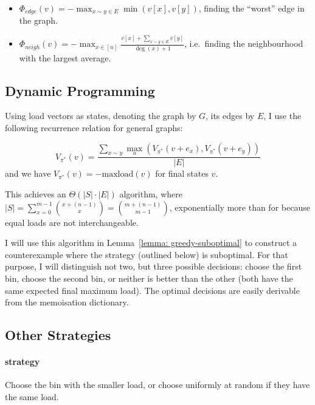 \begin{itemize}
    \item 
    $\Phi_{edge}(v)=-\max_{x\sim y \in E} \min(v[x], v[y])$, finding the ``worst'' edge in the graph.
    \item
    $\Phi_{neigh}(v)=-\max_{x \in [n]} \frac{v[x]+\sum_{x\sim y \in E}v[y]}{\deg(x)+1}$, i.e.\ finding the neighbourhood with the largest average.
\end{itemize}


\subsection{Dynamic Programming} \label{graphical-two-choice-dp}

Using load vectors as states, denoting the graph by $G$, its edges by $E$, I use the following recurrence relation for general graphs:


\begin{equation} \label{eq:graphicaltwochoice-dynamicprogramming}
    V_{\pi^*}(v) = \frac{\sum_{x\sim y}\max_a (V_{\pi^*}(v+e_x), V_{\pi^*}(v+e_y))}{|E|}
\end{equation}
and we have $V_{\pi^*}(v)=-\mathrm{maxload}(v)$ for final states $v$.

This achieves an $\Theta(|S|\cdot |E|)$ algorithm, where $|S| = \sum_{x=0}^{m-1} {{x+(n-1)} \choose {x}} = {{m+(n-1)} \choose {m-1}}$, exponentially more than for \TwoThinning because equal loads are not interchangeable.

I will use this algorithm in Lemma~\ref{lemma: greedy-suboptimal} to construct a counterexample where the \Greedy strategy (outlined below) is suboptimal. For that purpose, I will distinguish not two, but three possible decisions: choose the first bin, choose the second bin, or neither is better than the other (both have the same expected final maximum load). The optimal decisions are easily derivable from the memoisation dictionary.


\subsection{Other Strategies} \label{graphical-two-choice-otherstrategies}


\paragraph{\Greedy strategy} Choose the bin with the smaller load, or choose uniformly at random if they have the same load.


